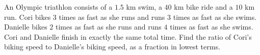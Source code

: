 An Olympic triathlon consists of a $1.5$ km swim, a $40$ km bike ride and a $10$ km run. Cori bikes $3$ times as fast as she runs and runs $3$ times as fast as she swims. Danielle bikes $2$ times as fast as she runs and runs $4$ times as fast as she swims. Cori and Danielle finish in exactly the same total time. Find the ratio of Cori's biking speed to Danielle's biking speed, as a fraction in lowest terms.
